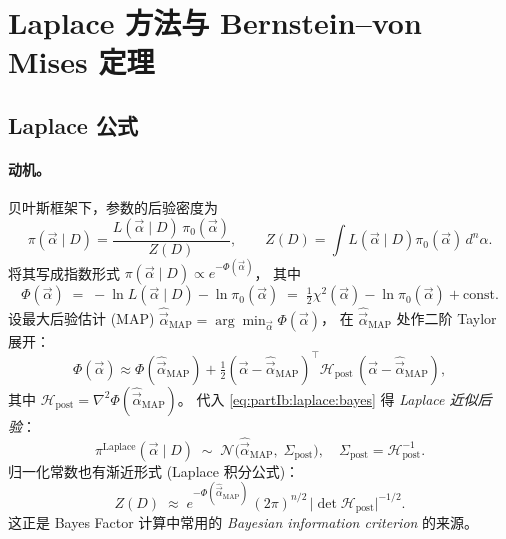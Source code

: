 \section{Laplace 方法与 Bernstein--von Mises 定理}
\label{sec:partIb:laplace}

\subsection{Laplace 公式}
\label{sec:partIb:laplace:formula}

\paragraph{动机。}
贝叶斯框架下，参数的后验密度为
\begin{equation}
  \pi(\vec\alpha\mid D)
  = \frac{L(\vec\alpha\mid D)\,\pi_0(\vec\alpha)}{Z(D)},
  \qquad
  Z(D)=\!\!\int\!\! L(\vec\alpha\mid D)\pi_0(\vec\alpha)\,d^n\alpha.
  \label{eq:partIb:laplace:bayes}
\end{equation}
将其写成指数形式 $\pi(\vec\alpha\mid D)\propto e^{-\Phi(\vec\alpha)}$，
其中
\begin{equation}
  \Phi(\vec\alpha)
  \;=\;
  -\ln L(\vec\alpha\mid D)-\ln\pi_0(\vec\alpha)
  \;=\;
  \tfrac12\chi^2(\vec\alpha)-\ln\pi_0(\vec\alpha)+\mathrm{const}.
  \label{eq:partIb:laplace:phi}
\end{equation}
设最大后验估计 (MAP) $\hat{\vec\alpha}_{\mathrm{MAP}}=\arg\min_{\vec\alpha}\Phi(\vec\alpha)$，
在 $\hat{\vec\alpha}_{\mathrm{MAP}}$ 处作二阶 Taylor 展开：
\begin{equation}
  \Phi(\vec\alpha)
  \approx
  \Phi(\hat{\vec\alpha}_{\mathrm{MAP}})
  +\tfrac12 (\vec\alpha-\hat{\vec\alpha}_{\mathrm{MAP}})^{\top}
            \mathcal H_{\mathrm{post}}\,
            (\vec\alpha-\hat{\vec\alpha}_{\mathrm{MAP}}),
  \label{eq:partIb:laplace:taylor}
\end{equation}
其中 $\mathcal H_{\mathrm{post}}=\nabla^2\Phi(\hat{\vec\alpha}_{\mathrm{MAP}})$。
代入 \eqref{eq:partIb:laplace:bayes} 得 \emph{Laplace 近似后验}：
\begin{equation}
  \boxed{
  \pi^{\mathrm{Laplace}}(\vec\alpha\mid D)
  \;\sim\;
  \mathcal N\!\bigl(\hat{\vec\alpha}_{\mathrm{MAP}},
                   \;\Sigma_{\mathrm{post}}\bigr),
  \quad
  \Sigma_{\mathrm{post}}=\mathcal H_{\mathrm{post}}^{-1}.
  }
  \label{eq:partIb:laplace:posterior}
\end{equation}
归一化常数也有渐近形式 (Laplace 积分公式)：
\begin{equation}
  Z(D)
  \;\approx\;
  e^{-\Phi(\hat{\vec\alpha}_{\mathrm{MAP}})}
  \,(2\pi)^{n/2}
  \,\bigl|\det \mathcal H_{\mathrm{post}}\bigr|^{-1/2}.
  \label{eq:partIb:laplace:Z}
\end{equation}
这正是 Bayes Factor 计算中常用的 \emph{Bayesian information criterion} 的来源。

